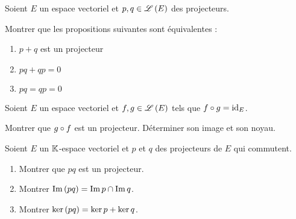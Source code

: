 \begin{exo}[Exercice 10]
Soient \(E\) un espace vectoriel et \(p,q\in\mathscr{L}\left(E\right)\) des projecteurs.

Montrer que les propositions suivantes sont équivalentes :

\begin{enumerate}
\item \(p+q\) est un projecteur \\

\item \(pq+qp=0\) \\

\item \(pq=qp=0\)
\end{enumerate}
\end{exo}

\begin{corr}
\end{corr}

\begin{exo}[Exercice 11]
Soient \(E\) un espace vectoriel et \(f,g\in\mathscr{L}\left(E\right)\) tels que \(f\circ g=\mathrm{id}_{E}\).

Montrer que \(g\circ f\) est un projecteur. Déterminer son image et son noyau.
\end{exo}

\begin{corr}
\end{corr}

\begin{exo}[Exercice 12]
Soient \(E\) un \(\mathbb{K}\)-espace vectoriel et \(p\) et \(q\) des projecteurs de \(E\) qui commutent.

\begin{enumerate}
\item Montrer que \(pq\) est un projecteur. \\

\item Montrer \(\operatorname{Im}\left(pq\right)=\operatorname{Im} p\cap\operatorname{Im} q\). \\

\item Montrer \(\ker\left(pq\right)=\ker p+\ker q\).
\end{enumerate}
\end{exo}

\begin{corr}
\end{corr}

